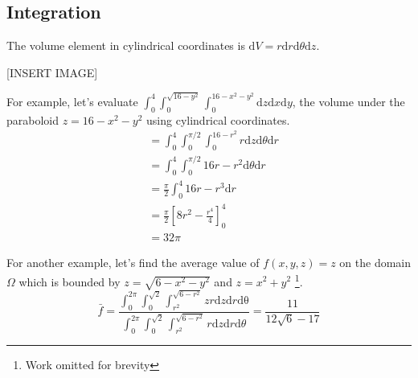 \subsection{Integration}
\noindent
The volume element in cylindrical coordinates is $\mathrm{d}V = r\mathrm{d}r\mathrm{d}\theta\mathrm{d}z$.

[INSERT IMAGE]

\noindent
For example, let's evaluate $\int_{0}^{4}{\int_{0}^{\sqrt{16 - y^2}}{\int_{0}^{16 - x^2 - y^2}{\mathrm{d}z}\mathrm{d}x}\mathrm{d}y}$, the volume under the paraboloid $z = 16 - x^2 - y^2$ using cylindrical coordinates.
\begin{align*}
	&= \int_{0}^{4}{\int_{0}^{\pi/2}{\int_{0}^{16 - r^2}{r\mathrm{d}z}\mathrm{d}\theta}\mathrm{d}r} \\
	&= \int_{0}^{4}{\int_{0}^{\pi/2}{16r - r^2\mathrm{d}\theta}\mathrm{d}r} \\
	&= \frac{\pi}{2}\int_{0}^{4}{16r - r^3\mathrm{d}r} \\
	&= \frac{\pi}{2}\left[8r^2 - \frac{r^4}{4}\right]_0^4 \\
	&= 32\pi
\end{align*}

\noindent
For another example, let's find the average value of $f(x,y,z) = z$ on the domain $\Omega$ which is bounded by $z = \sqrt{6-x^2-y^2}$ and $z = x^2+y^2$ \footnote{Work omitted for brevity}.
\begin{equation*}
	\bar{f} = \frac{\int_{0}^{2\pi}{\int_{0}^{\sqrt{2}}{\int_{r^2}^{\sqrt{6 - r^2}}{zr\mathrm{d}z}\mathrm{d}r}\mathrm{d\theta}}}{\int_{0}^{2\pi}{\int_{0}^{\sqrt{2}}{\int_{r^2}^{\sqrt{6 - r^2}}{r\mathrm{d}z}\mathrm{d}r}\mathrm{d}\theta}}=\frac{11}{12\sqrt{6} - 17}
\end{equation*}